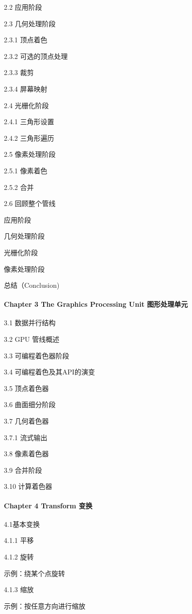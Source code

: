 \documentclass[
  paper=a4,
  ,captions=tableheading
]{scrartcl}
\begin{document}
2.2 应用阶段

2.3 几何处理阶段

2.3.1 顶点着色

2.3.2 可选的顶点处理

2.3.3 裁剪

2.3.4 屏幕映射

2.4 光栅化阶段

2.4.1 三角形设置

2.4.2 三角形遍历

2.5 像素处理阶段

2.5.1 像素着色

2.5.2 合并

2.6 回顾整个管线

应用阶段

几何处理阶段

光栅化阶段

像素处理阶段

总结（Conclusion)

\paragraph{Chapter 3 The Graphics Processing Unit
图形处理单元}\label{chapter-3-the-graphics-processing-unit-ux56feux5f62ux5904ux7406ux5355ux5143}

3.1 数据并行结构

3.2 GPU 管线概述

3.3 可编程着色器阶段

3.4 可编程着色及其API的演变

3.5 顶点着色器

3.6 曲面细分阶段

3.7 几何着色器

3.7.1 流式输出

3.8 像素着色器

3.9 合并阶段

3.10 计算着色器

\paragraph{Chapter 4 Transform
变换}\label{chapter-4-transform-ux53d8ux6362}

4.1基本变换

4.1.1 平移

4.1.2 旋转

示例：绕某个点旋转

4.1.3 缩放

示例：按任意方向进行缩放
\end{document}
